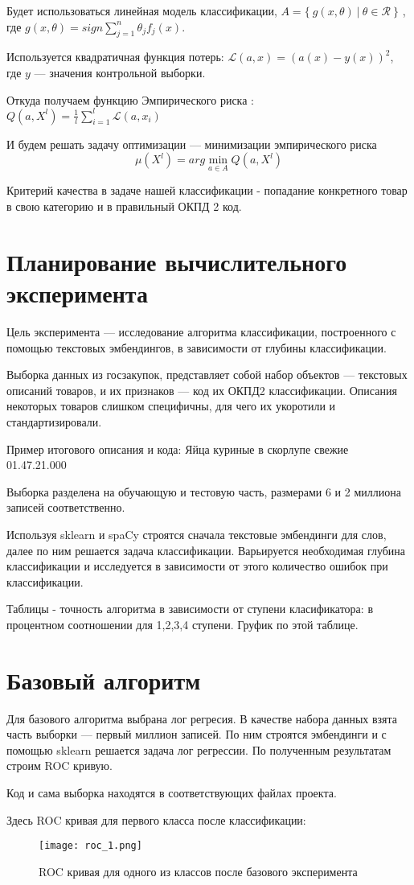 \documentclass{article}
\begin{document}
Будет использоваться линейная модель классификации, $A = \{ \ g(x,\theta) \ | \ \theta \in \mathcal{R} \ \}$ , где $g(x, \theta) = sign \sum \limits_{j=1}^n \theta_j f_j(x)$.

Используется квадратичная функция потерь: $\mathcal{L}(a,x) = (a(x) - y(x))^2$, где $y$ --- значения контрольной выборки.  

Откуда получаем функцию Эмпирического риска : $Q(a,X^l)=\frac{1}{l}\sum\limits^l_{i=1}\mathcal{L}(a,x_i)$

И будем решать задачу оптимизации --- минимизации эмпирического риска 
$$ \mu(X^l) = arg \min_{a\in A} Q(a, X^l)$$


Критерий качества в задаче нашей классификации - попадание конкретного товар в свою категорию и в правильный ОКПД 2 код.


\section{Планирование вычислительного эксперимента}

Цель эксперимента --- исследование алгоритма классификации, построенного с помощью текстовых эмбендингов, в зависимости от глубины классификации.

Выборка данных из госзакупок, представляет собой набор объектов --- текстовых описаний товаров, и их признаков --- код их ОКПД2 классификации. Описания некоторых товаров слишком специфичны, для чего их укоротили и стандартизировали. %

Пример итогового описания и кода: Яйца куриные в скорлупе свежие	01.47.21.000  

Выборка разделена на обучающую и тестовую часть, размерами 6 и 2 миллиона записей соответственно.  

Используя sklearn и spaCy строятся сначала текстовые эмбендинги для слов, далее по ним решается задача классификации. Варьируется необходимая глубина классификации и исследуется в зависимости от этого количество ошибок при классификации.

Таблицы - точность алгоритма в зависимости от ступени класификатора: 
в процентном соотношении для 1,2,3,4 ступени.
Груфик по этой таблице.

\section{Базовый алгоритм}
Для базового алгоритма выбрана лог регресия.  
В качестве набора данных взята часть выборки --- первый миллион записей. По ним строятся эмбендинги и с помощью sklearn решается задача лог регрессии. По полученным результатам строим ROC кривую.

Код и сама выборка находятся в соответствующих файлах проекта.

Здесь ROC кривая для первого класса после классификации:
\begin{figure}[h]
\centering
\texttt{[image: roc\_1.png]}
\caption{ROC кривая для одного из классов после базового эксперимента}
\label{fig:mpr}
\end{figure}



\end{document}
